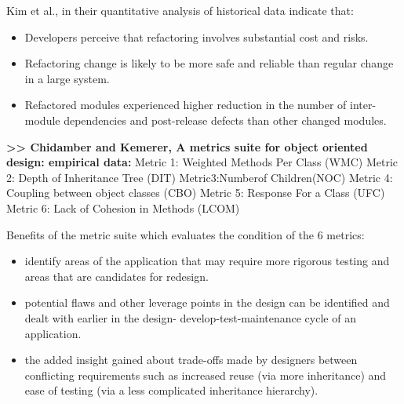 Kim et al., in their quantitative analysis of historical data indicate that:
\begin{itemize}
\item Developers perceive that refactoring involves substantial cost and risks.
\item Refactoring change is likely to be more safe and reliable than regular change in a large system.
\item Refactored modules experienced higher reduction in the number of inter-module dependencies and post-release defects than other changed modules.
\end{itemize}

\textbf{>> Chidamber and Kemerer, A metrics suite for object oriented design: empirical data:}
Metric 1: Weighted Methods Per Class (WMC)
Metric 2: Depth of Inheritance Tree (DIT)
Metric3:Numberof Children(NOC)
Metric 4: Coupling between object classes (CBO)
Metric 5: Response For a Class (UFC)
Metric 6: Lack of Cohesion in Methods (LCOM)

Benefits of the metric suite which evaluates the condition of the 6 metrics:
\begin{itemize}
\item identify areas of the application that may require more rigorous testing and areas that are candidates for redesign. 
\item potential flaws and other leverage points in the design can be identified and dealt with earlier in the design- develop-test-maintenance cycle of an application. 
\item the added insight gained about trade-offs made by designers between conflicting requirements such as increased reuse (via more inheritance) and ease of testing (via a less complicated inheritance hierarchy).
\end{itemize}
